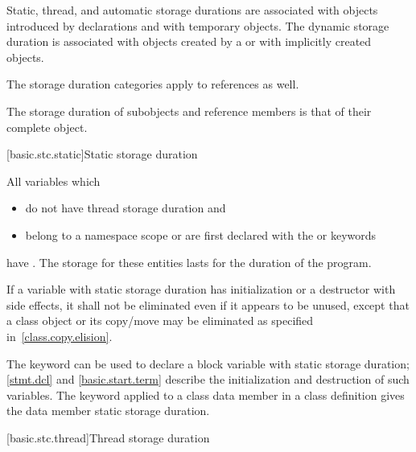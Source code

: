 \pnum
{}%
%
%
%
Static, thread, and automatic storage durations are associated with objects
introduced by declarations and
with temporary objects.
The dynamic storage duration
is associated with objects created by a
 or
with implicitly created objects.

\pnum
The storage duration categories apply to references as well.

\pnum
{}%
The storage duration of subobjects and reference members
is that of their complete object.
%

[basic.stc.static]{Static storage duration}

\pnum
All variables which
\begin{itemize}
\item
do not have thread storage duration and
\item
belong to a namespace scope or
are first declared with
the  or  keywords
\end{itemize}
have .
The storage for these entities lasts for the duration of the
program.

\pnum
If a variable with static storage duration has initialization or a
destructor with side effects, it shall not be eliminated even if it
appears to be unused, except that a class object or its copy/move may be
eliminated as specified in~\ref{class.copy.elision}.

\pnum
\begin{note}
%
The keyword  can be used to declare
a block variable with static storage duration;
\ref{stmt.dcl} and \ref{basic.start.term} describe the
initialization and destruction of such variables.
%
The keyword  applied to
a class data member in a class definition
gives the data member static storage duration.
\end{note}

[basic.stc.thread]{Thread storage duration}

